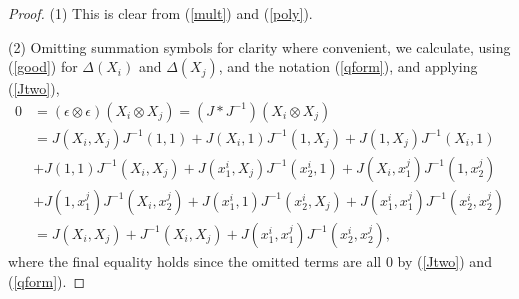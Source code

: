 \documentclass{amsart}
\numberwithin{equation}{section}
\theoremstyle{definition}
\begin{document}
\begin{proof} 
(1) This is clear from  (\ref{mult}) and (\ref{poly}). 

(2) Omitting summation symbols for clarity where convenient, we calculate, using (\ref{good}) for $\Delta(X_i)$ and $\Delta (X_j)$, and the notation (\ref{qform}), and applying (\ref{Jtwo}),
\begin{align*} 
0 &= (\epsilon \otimes \epsilon)(X_i \otimes X_j)= (J\ast J^{-1})(X_i \otimes X_j)\\
&= J(X_i,X_j)J^{-1}(1,1) + J(X_i,1)J^{-1}(1,X_j) +J(1,X_j)J^{-1}(X_i,1)\\
& +J(1,1)J^{-1}(X_i,X_j) + J(x^i_1,X_j)J^{-1}(x^i_2,1)+J(X_i, x^j_1)J^{-1}(1,x^j_2)\\
& + J(1,x^j_1)J^{-1}(X_i,x^j_2)+J(x^i_1,1)J^{-1}(x^i_2, X_j) + J(x^i_1,x^j_1)J^{-1}(x^i_2, x^j_2)\\
&= J(X_i,X_j) + J^{-1}(X_i,X_j) + J(x^i_1,x^j_1)J^{-1}(x^i_2, x^j_2), 
\end{align*}
where the final equality holds since the omitted terms are all $0$ by (\ref{Jtwo}) and (\ref{qform}).


\end{proof}
\end{document}
